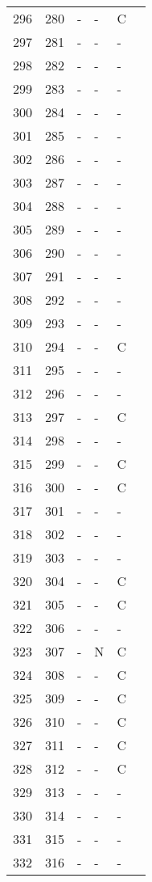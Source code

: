 \documentclass[10pt]{article}
\begin{document}
\begin{longtable}{llllll}
  296 & 280 & - & - & C &  \\ 
  297 & 281 & - & - & - &  \\ 
  298 & 282 & - & - & - &  \\ 
  299 & 283 & - & - & - &  \\ 
  300 & 284 & - & - & - &  \\ 
  301 & 285 & - & - & - &  \\ 
  302 & 286 & - & - & - &  \\ 
  303 & 287 & - & - & - &  \\ 
  304 & 288 & - & - & - &  \\ 
  305 & 289 & - & - & - &  \\ 
  306 & 290 & - & - & - &  \\ 
  307 & 291 & - & - & - &  \\ 
  308 & 292 & - & - & - &  \\ 
  309 & 293 & - & - & - &  \\ 
  310 & 294 & - & - & C &  \\ 
  311 & 295 & - & - & - &  \\ 
  312 & 296 & - & - & - &  \\ 
  313 & 297 & - & - & C &  \\ 
  314 & 298 & - & - & - &  \\ 
  315 & 299 & - & - & C &  \\ 
  316 & 300 & - & - & C &  \\ 
  317 & 301 & - & - & - &  \\ 
  318 & 302 & - & - & - &  \\ 
  319 & 303 & - & - & - &  \\ 
  320 & 304 & - & - & C &  \\ 
  321 & 305 & - & - & C &  \\ 
  322 & 306 & - & - & - &  \\ 
  323 & 307 & - & N & C &  \\ 
  324 & 308 & - & - & C &  \\ 
  325 & 309 & - & - & C &  \\ 
  326 & 310 & - & - & C &  \\ 
  327 & 311 & - & - & C &  \\ 
  328 & 312 & - & - & C &  \\ 
  329 & 313 & - & - & - &  \\ 
  330 & 314 & - & - & - &  \\ 
  331 & 315 & - & - & - &  \\ 
  332 & 316 & - & - & - &  \\ 

\end{longtable}
\end{document}
